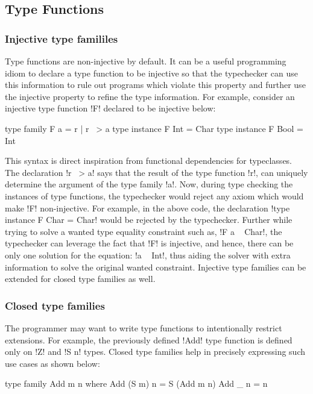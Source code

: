 \documentclass[screen,nonacm]{acmart}
\begin{document}
\subsection{Type Functions}\label{sec:rw-type-fun}
\subsubsection{Injective type famililes}
Type functions are non-injective by default. It can be a useful programming idiom to declare a type function to be injective so that the typechecker can use this information to rule out programs which violate this property and further use the injective property to refine the type information. For example, consider an injective type function !F! declared to be injective below:

\begin{CenteredBox}
\begin{code}
type family F a = r | r ~> a
type instance F Int = Char
type instance F Bool = Int
\end{code}
\end{CenteredBox}
This syntax is direct inspiration from functional dependencies for typeclasses. The declaration !r ~> a! says that the result of the type function !r!, can uniquely determine the argument of the type family !a!. Now, during type checking the instances of type functions, the typechecker would reject any axiom which would make !F! non-injective. For example, in the above code, the declaration !type instance F Char = Char! would be rejected by the typechecker. Further while trying to solve a wanted type equality constraint such as, !F a ~ Char!, the typechecker can leverage the fact that !F! is injective, and hence, there can be only one solution for the equation: !a ~ Int!, thus aiding the solver with extra information to solve the original wanted constraint. Injective type families\cite{stolarek_injective_2015} can be extended for closed type families as well.

\subsubsection{Closed type families}
The programmer may want to write type functions to intentionally restrict extensions. For example, the previously defined !Add! type function is defined only on !Z! and !S n! types. Closed type families\cite{eisenberg_typefamilies_2014} help in precisely expressing such use cases as shown below:

\begin{CenteredBox}
\begin{code}
type family Add m n where
  Add (S m) n = S (Add m n)
  Add _ n = n
\end{code}
\end{CenteredBox}
\end{document}
